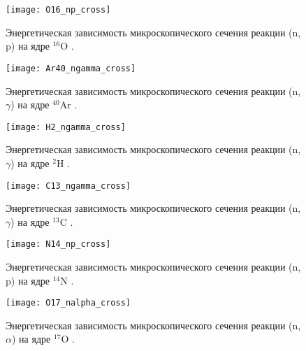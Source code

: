 \clearpage


\renewcommand{\thefigure}{\textmd{В.}\arabic{figure}}
\setcounter{figure}{0}

\begin{figure}[ht]
\centering
    \texttt{[image: O16\_np\_cross]}
    \captionsetup{justification=centering}
    \caption{Энергетическая зависимость микроскопического сечения реакции (n, p) на ядре $^{16}\text{O}$ \cite{janis}.}
    \label{fig_O16_cross}
\end{figure}

\begin{figure}[ht]
\centering
    \texttt{[image: Ar40\_ngamma\_cross]}
    \captionsetup{justification=centering}
    \caption{Энергетическая зависимость микроскопического сечения реакции (n, $\gamma$) на ядре $^{40}\text{Ar}$ \cite{janis}.}
    \label{fig_Ar40_cross}
\end{figure}

\begin{figure}[ht]
\centering
    \texttt{[image: H2\_ngamma\_cross]}
    \captionsetup{justification=centering}
    \caption{Энергетическая зависимость микроскопического сечения реакции (n, $\gamma$) на ядре $^{2}\text{H}$ \cite{janis}.}
    \label{fig_H2_cross}
\end{figure}

\begin{figure}[ht]
\centering
    \texttt{[image: C13\_ngamma\_cross]}
    \captionsetup{justification=centering}
    \caption{Энергетическая зависимость микроскопического сечения реакции (n, $\gamma$) на ядре $^{13}\text{C}$ \cite{janis}.}
    \label{fig_C13_cross}
\end{figure}

\begin{figure}[ht]
\centering
    \texttt{[image: N14\_np\_cross]}
    \captionsetup{justification=centering}
    \caption{Энергетическая зависимость микроскопического сечения реакции (n, p) на ядре $^{14}\text{N}$ \cite{janis}.}
    \label{fig_N14_cross}
\end{figure}

\begin{figure}[ht]
\centering
    \texttt{[image: O17\_nalpha\_cross]}
    \captionsetup{justification=centering}
    \caption{Энергетическая зависимость микроскопического сечения реакции (n, $\alpha$) на ядре $^{17}\text{O}$ \cite{janis}.}
    \label{fig_O17_cross}
\end{figure}

